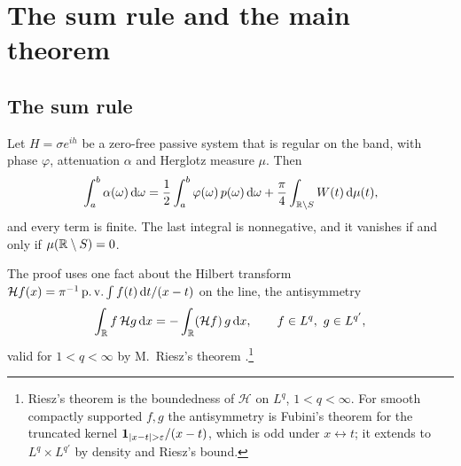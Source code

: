 \section{The sum rule and the main theorem}\label{sec:sumrule}

\subsection{The sum rule}

\begin{theorem}\label{thm:sumrule}
Let $H=\sigma e^{ih}$ be a zero-free passive system that is regular on the
band, with phase $\varphi$, attenuation $\alpha$ and Herglotz measure $\mu$.
Then
\begin{equation}\label{eq:sumrule}
\int_a^b\alpha(\omega)\,\mathrm d\omega
=\frac12\int_a^b\varphi(\omega)\,p(\omega)\,\mathrm d\omega
+\frac\pi4\int_{\mathbb R\setminus S}W(t)\,\mathrm d\mu(t),
\end{equation}
and every term is finite. The last integral is nonnegative, and it vanishes
if and only if $\mu(\mathbb R\setminus S)=0$.
\end{theorem}

The proof uses one fact about the Hilbert transform $\mathcal Hf(x)=\pi^{-1}
\operatorname{p.v.}\int f(t)\,\mathrm d t/(x-t)$ on the line, the antisymmetry
\begin{equation}\label{eq:riesz}
\int_\mathbb R f\,\mathcal Hg\,\mathrm d x=-\int_\mathbb R(\mathcal Hf)\,g\,\mathrm d x ,
\qquad f\in L^{q},\ g\in L^{q'},
\end{equation}
valid for $1<q<\infty$ by M.~Riesz's theorem \cite{titchmarsh,king}.\footnote{Riesz's theorem is the boundedness of $\mathcal H$ on $L^q$, $1<q<\infty$. For smooth compactly supported $f,g$ the antisymmetry is Fubini's theorem for the truncated kernel $\mathbf 1_{\abs{x-t}>\varepsilon}/(x-t)$, which is odd under $x\leftrightarrow t$; it extends to $L^q\times L^{q'}$ by density and Riesz's bound.}

